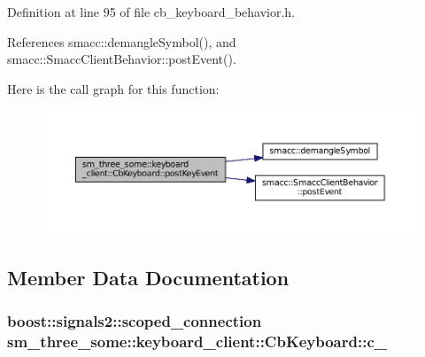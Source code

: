 Definition at line 95 of file cb\+\_\+keyboard\+\_\+behavior.\+h.



References smacc\+::demangle\+Symbol(), and smacc\+::\+Smacc\+Client\+Behavior\+::post\+Event().




Here is the call graph for this function\+:
\nopagebreak
\begin{figure}[H]
\begin{center}
\leavevmode
\includegraphics[width=350pt]{classsm__three__some_1_1keyboard__client_1_1CbKeyboard_ac4d9cfb76f7776aa0e1c204687e1c0cf_cgraph}
\end{center}
\end{figure}




\subsection{Member Data Documentation}
\subsubsection[{\texorpdfstring{c\+\_\+}{c_}}]{\setlength{\rightskip}{0pt plus 5cm}boost\+::signals2\+::scoped\+\_\+connection sm\+\_\+three\+\_\+some\+::keyboard\+\_\+client\+::\+Cb\+Keyboard\+::c\+\_\+}\hypertarget{classsm__three__some_1_1keyboard__client_1_1CbKeyboard_ad1271d27ebd136b3895648157836ab6a}{}\label{classsm__three__some_1_1keyboard__client_1_1CbKeyboard_ad1271d27ebd136b3895648157836ab6a}


